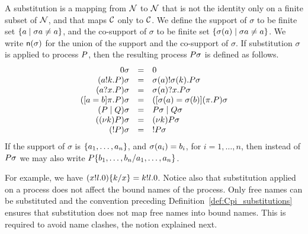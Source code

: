 \begin{definition}[Substitution]\label{def:Cpi_substitutions}
A substitution is a mapping from ${\cal N}$ to ${\cal N}$ that is not the identity only on a finite subset of ${\cal N}$, and that maps ${\cal C}$ only to ${\cal C}$. We define the support of $\sigma$ to be finite set $\{a\;|\; \sigma{a}\not=a \}$, and the co-support of $\sigma$ to be finite set $\{\sigma(a) \;|\; \sigma{a}\not=a \}$. We write $\mathsf{n}(\sigma)$ for the union of the support and the co-support of $\sigma$.
If substitution $\sigma$ is applied to process $P$, then the resulting process $P\sigma$ is defined  as follows.
\[
\begin{array}{rclr}
\inact\sigma & = & \inact\\
(\send\NA\role\msg\NK.\PP)\sigma & = & \send{\sigma(\NA)}\role\msg{\sigma(\NK)}.\PP\sigma \\ %
(\receive\NA\role\msg\NX.\PP)\sigma & = & \receive{\sigma(\NA)}\role\msg{\NX}.\PP\sigma\\ %
(\match\NA\role\msg\NB\pi.\PP)\sigma & = &  (\match{\sigma(\NA)}\role\msg{\sigma(\NB)}(\pi.\PP)\sigma\\
(\PP \parop\PQ)\sigma & = & \PP\sigma \parop \PQ\sigma\\
(\rest\NK\PP)\sigma & = & \rest{\NK} \PP\sigma\\ %
(\rep\PP)\sigma & = & \rep\PP\sigma
\end{array}
\]
If the support of $\sigma$ is $\{a_1, \ldots, a_n\}$, and $\sigma(a_i)=b_i$, for $i=1,\ldots,n$, then instead of $P\sigma$ we may also write $P\{b_1, \ldots, b_n/a_1, \ldots, a_n\}$.
\end{definition}
%
For example, we have  
$(x!l.0)\{k/x\}=k!l.0$. 
Notice also that substitution applied on a process does not affect the bound names of the process. 
Only free names can be substituted and the convention preceding Definition~\ref{def:Cpi_substitutions} ensures that substitution does not map free names into bound names. %
This is required to avoid name clashes, the notion explained next.

